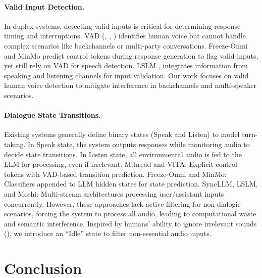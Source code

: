 \documentclass[11pt]{article}
\begin{document}
\paragraph{Valid Input Detection.}
In duplex systems, detecting valid inputs is critical for determining response timing and interruptions. VAD (\citealp{mihalache2022using}, \citealp{deng2013statistical}, \citealp{ramirez2004efficient}) identifies human voice but cannot handle complex scenarios like backchannels or multi-party conversations. Freeze-Omni and MinMo predict control tokens during response generation to flag valid inputs, yet still rely on VAD for speech detection. LSLM \cite{ma2024languagemodellistenspeaking}, integrates information from speaking and listening channels for input validation. Our work focuses on valid human voice detection to mitigate interference in backchannels and multi-speaker scenarios.

\paragraph{Dialogue State Transitions.}
Existing systems generally define binary states (Speak and Listen) to model turn-taking. In Speak state, the system outputs responses while monitoring audio to decide state transitions. In Listen state, all environmental audio is fed to the LLM for processing, even if irrelevant. Mthread and VITA: Explicit control tokens with VAD-based transition prediction. Freeze-Omni and MinMo: Classifiers appended to LLM hidden states for state prediction. SyncLLM, LSLM, and Moshi: Multi-stream architectures processing user/assistant inputs concurrently. However, these approaches lack active filtering for non-dialogic scenarios, forcing the system to process all audio, leading to computational waste and semantic interference. Inspired by humans’ ability to ignore irrelevant sounds (\citealp{shinn2008object}), we introduce an ``Idle'' state to filter non-essential audio inputs.

\section{Conclusion}
\end{document}
